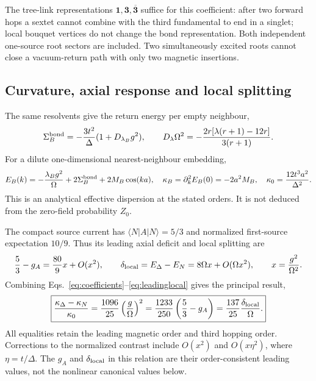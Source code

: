 \documentclass[11pt]{article}
\newcommand{\ket}[1]{\lvert #1\rangle}
\newcommand{\bra}[1]{\langle #1\rvert}
\begin{document}
The tree-link representations $\mathbf1,\mathbf3,\overline{\mathbf3}$ suffice for this coefficient: after two forward hops a sextet cannot combine with the third fundamental to end in a singlet; local bouquet vertices do not change the bond representation. Both independent one-source root sectors are included. Two simultaneously excited roots cannot close a vacuum-return path with only two magnetic insertions.

\subsection{Curvature, axial response and local splitting}
The same resolvents give the return energy per empty neighbour,
\begin{equation}
 \Sigma_B^{\rm bond}=-\frac{3t^2}{\Delta}(1+D_{\lambda_B}g^2),\qquad
 D_\lambda\Omega^2=-\frac{2r[\lambda(r+1)-12r]}{3(r+1)}. \label{eq:return}
\end{equation}
For a dilute one-dimensional nearest-neighbour embedding,
\begin{equation}
 E_B(k)=-\frac{\lambda_Bg^2}{\Omega}+2\Sigma_B^{\rm bond}+2M_B\cos(ka),\quad
 \kappa_B=\partial_k^2E_B(0)=-2a^2M_B,\quad
 \kappa_0=\frac{12t^3a^2}{\Delta^2}. \label{eq:band}
\end{equation}
This is an analytical effective dispersion at the stated orders. It is not deduced from the zero-field probability $Z_0$.

The compact source current has $\bra N A\ket N=5/3$ and normalized first-source expectation $10/9$. Thus its leading axial deficit and local splitting are
\begin{equation}
 \frac53-g_A=\frac{80}{9}x+O(x^2),\qquad
 \delta_{\rm local}=E_\Delta-E_N=8\Omega x+O(\Omega x^2),\qquad x=\frac{g^2}{\Omega^2}. \label{eq:leadinglocal}
\end{equation}
Combining Eqs.~\eqref{eq:coefficients}--\eqref{eq:leadinglocal} gives the principal result,
\begin{equation}
 \boxed{\frac{\kappa_\Delta-\kappa_N}{\kappa_0}
 =\frac{1096}{25}\left(\frac g\Omega\right)^2
 =\frac{1233}{250}\left(\frac53-g_A\right)
 =\frac{137}{25}\frac{\delta_{\rm local}}{\Omega}.} \label{eq:principal}
\end{equation}
All equalities retain the leading magnetic order and third hopping order. Corrections to the normalized contrast include $O(x^2)$ and $O(x\eta^2)$, where $\eta=t/\Delta$. The $g_A$ and $\delta_{\rm local}$ in this relation are their order-consistent leading values, not the nonlinear canonical values below.
\end{document}
